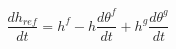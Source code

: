 \begin{equation}
\frac{dh_{ref}}{dt} = h^f-h \frac{d\theta^f }{dt} + h^g \frac{d\theta^g }{dt}
\end{equation}
